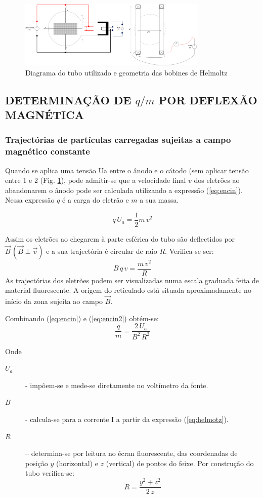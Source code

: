 \documentclass[a4paper,twoside,12pt]{article}      %
\begin{document}
\begin{figure}
	[!tb]  \centering 
	\includegraphics[width=0.8\textwidth]{TuboTL} 
	\caption{Diagrama do tubo utilizado e geometria das bobines de Helmoltz \label{fig:TL}} 
\end{figure}

\subsection{\sf DETERMINAÇÃO DE $q/m$ POR  DEFLEXÃO MAGNÉTICA}
\subsubsection{\sf Trajectórias de partículas carregadas sujeitas a campo magnético constante}
Quando se aplica uma tensão Ua entre o ânodo e o cátodo (sem aplicar tensão entre 1 e 2 (Fig. \ref{fig:TL}), pode admitir-se que a velocidade final $v$ dos eletrões ao abandonarem o ânodo pode ser calculada utilizando a expressão (\ref{eq:encin}). Nessa expressão  $q$  é a carga do eletrão e $m$ a sua massa.

\begin{equation}
	\label{eq:encin}
q\, U_a = \frac{1}{2} m \, v^2
\end{equation}

Assim os eletrões ao chegarem à parte esférica do tubo são deflectidos por $\vec{B}\,(\vec{B}\perp\vec{v})$ e a sua trajectória é circular de raio $R$. 
Verifica-se ser:
\begin{equation}
	\label{eq:encin2}
B \, q\, v = \frac{m\,v^2}{R} 
\end{equation}
As trajectórias dos eletrões podem ser visualizadas numa escala graduada feita de material fluorescente. 
A origem do reticulado está situada aproximadamente no início da zona 
sujeita ao campo $\vec{B}$.

Combinando (\ref{eq:encin}) e (\ref{eq:encin2}) obtém-se:
\begin{equation}
	\label{eq:encin3}
 \frac{q}{m} = \frac{2\, U_a}{B^2\,R^2} 
\end{equation}

Onde
\begin{description}
\item[$U_a$] - impõem-se e mede-se diretamente no voltímetro da fonte.
\item[$B$] - calcula-se para a corrente I a partir da expressão (\ref{eq:helmotz}).
\item[$R$] – determina-se por leitura no écran fluorescente, das coordenadas de posição $y$ (horizontal) e $z$ (vertical) de pontos do feixe. Por construção do tubo verifica-se:
\begin{equation}
	\label{eq:eR}
 R = \frac{y^2 + z^2}{2 \, z} 
\end{equation}
\end{description}
\end{document}
